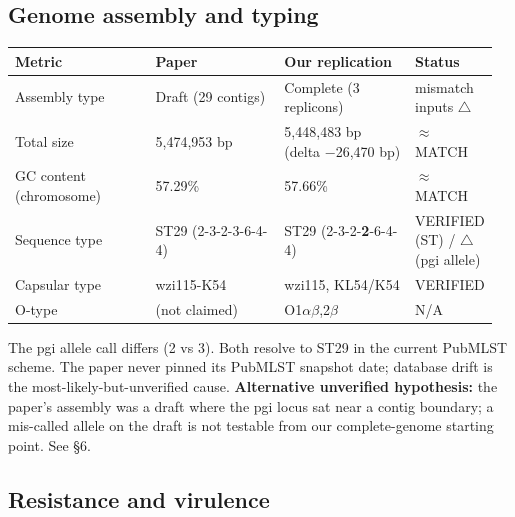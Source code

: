 \documentclass[11pt,letterpaper]{article}
\newcommand{\vok}{\textcolor{green!50!black}{\checkmark}}
\newcommand{\vwarn}{\textcolor{orange!80!black}{$\triangle$}}
\begin{document}
\subsection{Genome assembly and typing}

\begin{longtable}{@{}p{0.30\linewidth} p{0.28\linewidth} p{0.28\linewidth} p{0.10\linewidth}@{}}
\toprule
\textbf{Metric} & \textbf{Paper} & \textbf{Our replication} & \textbf{Status} \\
\midrule
\endfirsthead
Assembly type & Draft (29 contigs) & Complete (3 replicons) & mismatch inputs \vwarn \\
Total size & 5{,}474{,}953 bp & 5{,}448{,}483 bp (delta $-$26{,}470 bp) & $\approx$MATCH \\
GC content (chromosome) & 57.29\% & 57.66\% & $\approx$MATCH \\
Sequence type & ST29 (2-3-2-3-6-4-4) & ST29 (2-3-2-\textbf{2}-6-4-4) & VERIFIED (ST) / \vwarn{} (pgi allele) \\
Capsular type & wzi115-K54 & wzi115, KL54/K54 & VERIFIED \vok \\
O-type & (not claimed) & O1$\alpha\beta$,2$\beta$ & N/A \\
\bottomrule
\end{longtable}

The pgi allele call differs (2 vs 3). Both resolve to ST29 in the current PubMLST scheme. The paper never pinned its PubMLST snapshot date; database drift is the most-likely-but-unverified cause. \textbf{Alternative unverified hypothesis:} the paper's assembly was a draft where the pgi locus sat near a contig boundary; a mis-called allele on the draft is not testable from our complete-genome starting point. See \S6.

\subsection{Resistance and virulence}
\end{document}

